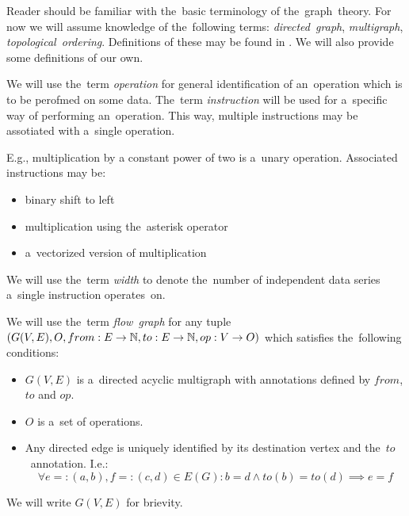 Reader should be familiar with the~basic terminology of the~graph~theory. For now we will assume knowledge of the~following terms: \emph{directed~graph}, \emph{multigraph}, \emph{topological~ordering}. Definitions of these may be found in \cite{kapitoly}. We will also provide some definitions of our own.

\begin{define}
We will use the~term \emph{operation} for general identification of an~operation which is to be perofmed on some data. The~term \emph{instruction} will be used for a~specific way of performing an~operation. This way, multiple instructions may be assotiated with a~single operation.
\end{define}

E.g., multiplication by a constant power of two is a~unary operation. Associated instructions may be:
\begin{itemize}
  \item binary shift to left
  \item multiplication using the~asterisk operator
  \item a~vectorized version of multiplication
\end{itemize}

\begin{define}
We will use the~term \emph{width} to denote the~number of independent data series a~single instruction operates~on.
\end{define}

\begin{define}
We will use the~term \emph{flow~graph} for any tuple $(G(V,E),O,from:E \rightarrow \mathbb{N}, to:E \rightarrow \mathbb{N}, op:V \rightarrow O)$ which satisfies the~following conditions:
\begin{itemize}
  \item $G(V,E)$ is a~directed acyclic multigraph with annotations defined by $from$, $to$ and $op$.
  \item $O$ is a~set of operations.
  \item Any directed edge is uniquely identified by its destination vertex and the~$to$~annotation. I.e.:
    $$ \forall{e=:(a,b),f=:(c,d)} \in {E(G)}: b = d \wedge to(b) = to(d) \implies e = f $$
\end {itemize}
    We will write $G(V,E)$ for brievity.
\end{define}

